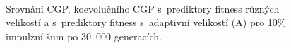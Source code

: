 \documentclass[fleqn,11pt]{ExcelAtFIT} %
\begin{document}
\begin{figure}[htb]
    \centering
    \\
    \caption{Srovnání CGP, koevolučního CGP s~prediktory fitness různých velikostí a s~prediktory fitness s~adaptivní velikostí (A) pro 10\% impulzní šum po 30~000 generacích.}
    \label{fig:ImpulseBoxplot}
\end{figure}
\end{document}
